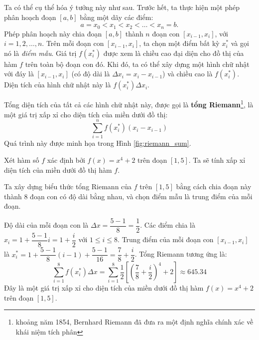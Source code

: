 Ta có thể cụ thể hóa ý tưởng này như sau. Trước hết, ta thực hiện một phép phân hoạch đoạn $[a, b]$ bằng một dãy các điểm:
\[ a = x_0 < x_1 < x_2 < \dots < x_n = b. \]
Phép phân hoạch này chia đoạn $[a, b]$ thành $n$ đoạn con $[x_{i-1}, x_i]$, với $i = 1, 2, \dots, n$. Trên mỗi đoạn con $[x_{i-1}, x_i]$, ta chọn một điểm bất kỳ $x_i^*$ và gọi nó là \textit{điểm mẫu}. Giá trị $f(x_i^*)$ được xem là chiều cao đại diện cho đồ thị của hàm $f$ trên toàn bộ đoạn con đó. Khi đó, ta có thể xây dựng một hình chữ nhật với đáy là $[x_{i-1}, x_i]$ (có độ dài là $\Delta x_i = x_i - x_{i-1}$) và chiều cao là $f(x_i^*)$. Diện tích của hình chữ nhật này là $f(x_i^*) \Delta x_i$.

Tổng diện tích của tất cả các hình chữ nhật này, được gọi là \textbf{tổng Riemann}\footnote{khoảng năm 1854, Bernhard Riemann đã đưa ra một định nghĩa chính xác về khái niệm tích phân}, là một giá trị xấp xỉ cho diện tích của miền dưới đồ thị:
\[ \sum_{i=1}^{n} f(x_i^*) (x_i - x_{i-1}) \]
Quá trình này được minh họa trong Hình \ref{fig:riemann_sum}.




\begin{example}
    Xét hàm số $f$ xác định bởi $f(x) = x^4 + 2$ trên đoạn $[1, 5]$. Ta sẽ tính xấp xỉ diện tích của miền dưới đồ thị hàm $f$.
    
    Ta xây dựng biểu thức tổng Riemann của $f$ trên $[1, 5]$ bằng cách chia đoạn này thành 8 đoạn con có độ dài bằng nhau, và chọn điểm mẫu là trung điểm của mỗi đoạn.
    
    Độ dài của mỗi đoạn con là $\Delta x = \dfrac{5-1}{8} = \dfrac{1}{2}$. Các điểm chia là $x_i = 1 + \dfrac{5-1}{8}i = 1 + \dfrac{i}{2}$ với $1 \le i \le 8$. Trung điểm của mỗi đoạn con $[x_{i-1}, x_i]$ là $x_i^* = 1 + \dfrac{5-1}{8}(i-1) + \dfrac{5-1}{16} = \dfrac{7}{8} + \dfrac{i}{2}$. Tổng Riemann tương ứng là:
    \[ \sum_{i=1}^{8} f(x_i^*) \Delta x = \sum_{i=1}^{8} \dfrac{1}{2} \left[ \left(\dfrac{7}{8} + \dfrac{i}{2}\right)^4 + 2 \right] \approx 645.34 \]
    Đây là một giá trị xấp xỉ cho diện tích của miền dưới đồ thị hàm $f(x) = x^4 + 2$ trên đoạn $[1, 5]$.
\end{example}

